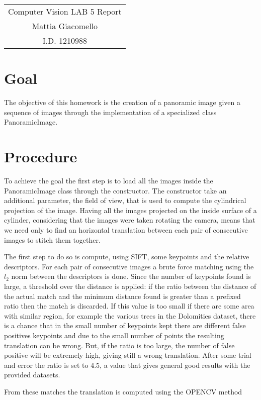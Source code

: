\documentclass[12pt,a4paper]{article}
\newcommand{\cc}{\fontfamily{txtt}\selectfont}
\begin{document}
\begin{center}
\begin{tabular}{c}
\LARGE{Computer Vision LAB 5 Report}\\
\large{Mattia Giacomello}\\
I.D. 1210988
\end{tabular}
\end{center}

\section{Goal}
The objective of this homework is the creation of a panoramic image given a sequence of images through the implementation of a specialized class {\cc PanoramicImage}.
\section{Procedure}
To achieve the goal the first step is to load all the images inside the {\cc PanoramicImage} class through the constructor. The constructor take an additional parameter, the field of view, that is used to compute the cylindrical projection of the image. Having all the images projected on the inside surface of a cylinder, considering that the images were taken rotating the camera, means that we need only to find an horizontal translation between each pair of consecutive images to stitch them together. 

The first step to do so is compute, using SIFT, some keypoints and the relative descriptors. For each pair of consecutive images a brute force matching using the $l_2$ norm between the descriptors is done. Since the number of keypoints found is large, a threshold over the distance is applied: if the ratio between the distance of the actual match and the minimum distance found is greater than a prefixed {\cc ratio} then the match is discarded. If this value is too small if there are some area with similar region, for example the various trees in the Dolomities dataset, there is a chance that in the small number of keypoints kept there are different false positives keypoints and due to the small number of points the resulting translation can be wrong. But, if the ratio is too large, the number of false positive will be extremely high, giving still a wrong translation. After some trial and error the {\cc ratio} is set to 4.5, a value that gives general good results with the provided datasets.

From these matches the translation is computed using the OPENCV method
\end{document}
